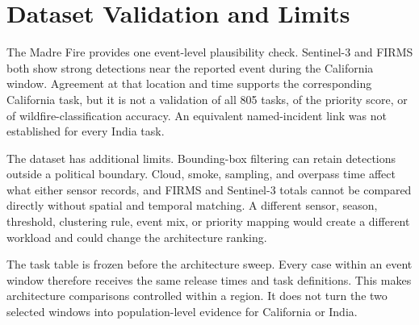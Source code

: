 \section{Dataset Validation and Limits}
The Madre Fire provides one event-level plausibility check. Sentinel-3 and FIRMS both show strong detections near the reported event during the California window. Agreement at that location and time supports the corresponding California task, but it is not a validation of all 805 tasks, of the priority score, or of wildfire-classification accuracy. An equivalent named-incident link was not established for every India task.

The dataset has additional limits. Bounding-box filtering can retain detections outside a political boundary. Cloud, smoke, sampling, and overpass time affect what either sensor records, and FIRMS and Sentinel-3 totals cannot be compared directly without spatial and temporal matching. A different sensor, season, threshold, clustering rule, event mix, or priority mapping would create a different workload and could change the architecture ranking.

The task table is frozen before the architecture sweep. Every case within an event window therefore receives the same release times and task definitions. This makes architecture comparisons controlled within a region. It does not turn the two selected windows into population-level evidence for California or India.
